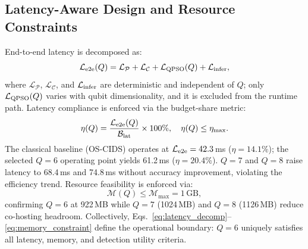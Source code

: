 \documentclass[conference]{IEEEtran}
\begin{document}
\subsection{Latency-Aware Design and Resource Constraints}
\label{subsec:latency_design}
End-to-end latency is decomposed as:
\begin{equation}
\mathcal{L}_{\rm e2e}(Q) =
\mathcal{L}_{\mathcal{P}} +
\mathcal{L}_{\mathcal{C}} +
\mathcal{L}_{\rm QPSO}(Q) +
\mathcal{L}_{\rm infer},
\label{eq:latency_decomp}
\end{equation}
where $\mathcal{L}_{\mathcal{P}}$, $\mathcal{L}_{\mathcal{C}}$,
and $\mathcal{L}_{\rm infer}$ are deterministic and independent
of $Q$; only $\mathcal{L}_{\rm QPSO}(Q)$ varies with qubit
dimensionality, and it is excluded from the runtime path.
Latency compliance is enforced via the budget-share metric:
\begin{equation}
\eta(Q)=\frac{\mathcal{L}_{\rm e2e}(Q)}{\mathcal{B}_{\rm lat}}
\times 100\%,\quad \eta(Q)\le\eta_{\max}.
\label{eq:budget_share}
\end{equation}
The classical baseline (OS-CIDS) operates at
$\mathcal{L}_{\rm e2e}=42.3$\,ms ($\eta=14.1\%$); the
selected $Q=6$ operating point yields 61.2\,ms ($\eta=20.4\%$).
$Q=7$ and $Q=8$ raise latency to 68.4\,ms and 74.8\,ms
without accuracy improvement, violating the efficiency trend.
Resource feasibility is enforced via:
\begin{equation}
\mathcal{M}(Q)\le\mathcal{M}_{\max}=1\,\text{GB},
\label{eq:memory_constraint}
\end{equation}
confirming $Q=6$ at 922\,MB while $Q=7$ (1024\,MB) and
$Q=8$ (1126\,MB) reduce co-hosting headroom.
Collectively, Eqs.~\eqref{eq:latency_decomp}--\eqref{eq:memory_constraint}
define the operational boundary: $Q=6$ uniquely satisfies
all latency, memory, and detection utility criteria.

\end{document}
